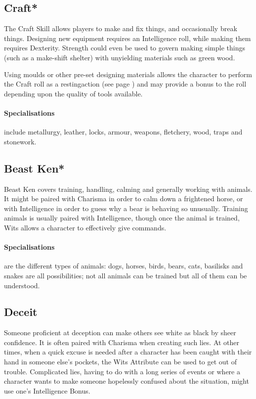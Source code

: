 \begin{multicols}{2}
\subsection{Craft*}

The Craft Skill allows players to make and fix things, and occasionally break things.
Designing new equipment requires an Intelligence roll, while making them requires Dexterity.
Strength could even be used to govern making simple things (such as a make-shift shelter) with unyielding materials such as green wood.

Using moulds or other pre-set designing materials allows the character to perform the Craft roll as a \gls{restingaction} (see page \pageref{restingactions}) and may provide a bonus to the roll depending upon the quality of tools available.

\paragraph{Specialisations} include metallurgy, leather, locks, armour, weapons, fletchery, wood, traps and stonework.

\subsection{Beast Ken*}

Beast Ken covers training, handling, calming and generally working with animals. It might be paired with Charisma in order to calm down a frightened horse, or with Intelligence in order to guess why a bear is behaving so unusually. Training animals is usually paired with Intelligence, though once the animal is trained, Wits allows a character to effectively give commands.

\paragraph{Specialisations} are the different types of animals: dogs, horses, birds, bears, cats, basilisks and snakes are all possibilities; not all animals can be trained but all of them can be understood.

\subsection{Deceit}

Someone proficient at deception can make others see white as black by sheer confidence. It is often paired with Charisma when creating such lies. At other times, when a quick excuse is needed after a character has been caught with their hand in someone else's pockets, the Wits Attribute can be used to get out of trouble. Complicated lies, having to do with a long series of events or where a character wants to make someone hopelessly confused about the situation, might use one's Intelligence Bonus.


\end{multicols}
